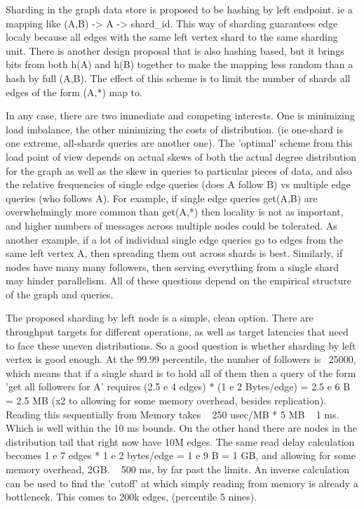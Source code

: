 \documentclass{article}
\begin{document}
Sharding in the graph data store is proposed to be hashing by left endpoint.  ie a mapping like (A,B) -> A -> shard\_id. This way of sharding guarantees edge localy because all edges with the same left vertex shard to the same sharding unit.  There is another design proposal that is also hashing based, but it brings bits from both h(A) and h(B) together to make the mapping less random than a hash by full (A,B). The effect of this scheme is to limit the number of shards all edges of the form (A,*) map to.

In any case, there are two immediate and competing interests. One is minimizing load imbalance, the other minimizing the costs of distribution. (ie one-shard is one extreme, all-shards queries are another one). The 'optimal' scheme from this load point of view depends on actual skews of both the actual degree distribution for the graph as well as the skew in queries to particular pieces of data, and also the relative frequencies of single edge queries (does A follow B) vs multiple edge queries (who follows A).  For example, if single edge queries get(A,B) are overwhelmingly more common than get(A,*) then locality is not as important, and higher numbers of messages across multiple nodes could be tolerated.  As another example, if a lot of individual single edge queries go to edges from the same left vertex A, then spreading them out across shards is best.  Similarly, if nodes have many many followers, then serving everything from a single shard may hinder parallelism. All of these questions depend on the empirical structure of the graph and queries.

The proposed sharding by left node is a simple, clean option. There are throughput targets for different operations, as well as target latencies that need to face these uneven distributions. So a good question is whether sharding by left vertex is good enough. At the 99.99 percentile, the number of followers is ~25000, which means that if a single shard is to hold all of them then a query of the form 'get all followers for A'  requires (2.5 e 4 edges) * (1 e 2 Bytes/edge) = 2.5 e 6 B = 2.5 MB   (x2 to allowing for some memory overhead, besides replication).   Reading this sequentially from Memory takes ~ 250 usec/MB * 5 MB ~ 1 ms. Which is well within the 10 ms bounds.  On the other hand there are nodes in the distribution tail that right now have 10M edges. The same read delay calculation becomes 1 e 7 edges * 1 e 2 bytes/edge = 1 e 9 B = 1 GB, and allowing for some memory overhead, 2GB. ~  500 ms, by far past the limits.  An inverse calculation can be used to find the 'cutoff' at which simply reading from memory is already a bottleneck.  This comes to 200k edges, (percentile 5  nines).
\end{document}
